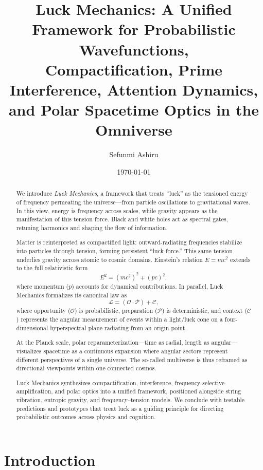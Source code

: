 \documentclass[12pt]{article}
\title{Luck Mechanics: A Unified Framework for Probabilistic Wavefunctions,\\
Compactification, Prime Interference, Attention Dynamics, and Polar Spacetime Optics in the Omniverse}
\author{Sefunmi Ashiru}
\date{\today}
\newcommand{\Luck}{\mathcal{L}}
\newcommand{\Opp}{\mathcal{O}}
\newcommand{\Prep}{\mathcal{P}}
\newcommand{\Circ}{\mathcal{C}}
\theoremstyle{plain}
\theoremstyle{definition}
\begin{document}
\maketitle

\begin{abstract}
  We introduce \emph{Luck Mechanics}, a framework that treats ``luck'' as the tensioned energy of frequency permeating the universe—from particle oscillations to gravitational waves. In this view, energy is frequency across scales, while gravity appears as the manifestation of this tension force. Black and white holes act as spectral gates, retuning harmonics and shaping the flow of information.  
  
  Matter is reinterpreted as compactified light: outward-radiating frequencies stabilize into particles through tension, forming persistent ``luck force.'' This same tension underlies gravity across atomic to cosmic domains. Einstein’s relation \(E=mc^2\) extends to the full relativistic form
  \[
  E^2 = (mc^2)^2 + (pc)^2,
  \]
  where momentum (\(p\)) accounts for dynamical contributions. In parallel, Luck Mechanics formalizes its canonical law as
  \[
  \Luck = (\Opp \cdot \Prep) + \Circ,
  \]
  where opportunity (\(\Opp\)) is probabilistic, preparation (\(\Prep\)) is deterministic, and context (\(\Circ\)) represents the angular measurement of events within a light/luck cone on a four-dimensional hyperspectral plane radiating from an origin point.  
  
  At the Planck scale, polar reparameterization—time as radial, length as angular—visualizes spacetime as a continuous expansion where angular sectors represent different perspectives of a single universe. The so-called multiverse is thus reframed as directional viewpoints within one connected cosmos.  
  
  Luck Mechanics synthesizes compactification, interference, frequency-selective amplification, and polar optics into a unified framework, positioned alongside string vibration, entropic gravity, and frequency–tension models. We conclude with testable predictions and prototypes that treat luck as a guiding principle for directing probabilistic outcomes across physics and cognition.
\end{abstract}

\tableofcontents
\newpage

\section{Introduction}
\end{document}
